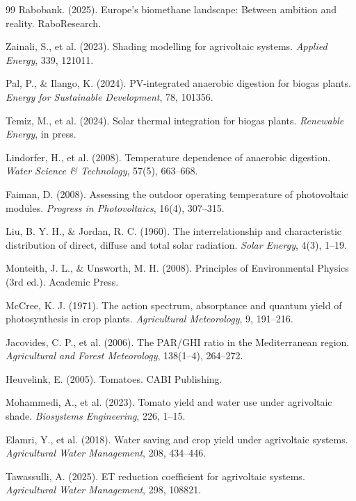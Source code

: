 \documentclass[12pt, a4paper]{article}
\begin{document}
\begin{thebibliography}{99}
 Rabobank. (2025). Europe's biomethane landscape: Between ambition and reality. RaboResearch.

 Zainali, S., et al. (2023). Shading modelling for agrivoltaic systems. \textit{Applied Energy}, 339, 121011.

 Pal, P., \& Ilango, K. (2024). PV-integrated anaerobic digestion for biogas plants. \textit{Energy for Sustainable Development}, 78, 101356.

 Temiz, M., et al. (2024). Solar thermal integration for biogas plants. \textit{Renewable Energy}, in press.

 Lindorfer, H., et al. (2008). Temperature dependence of anaerobic digestion. \textit{Water Science \& Technology}, 57(5), 663–668.

 Faiman, D. (2008). Assessing the outdoor operating temperature of photovoltaic modules. \textit{Progress in Photovoltaics}, 16(4), 307–315.

 Liu, B. Y. H., \& Jordan, R. C. (1960). The interrelationship and characteristic distribution of direct, diffuse and total solar radiation. \textit{Solar Energy}, 4(3), 1–19.

 Monteith, J. L., \& Unsworth, M. H. (2008). Principles of Environmental Physics (3rd ed.). Academic Press.

 McCree, K. J. (1971). The action spectrum, absorptance and quantum yield of photosynthesis in crop plants. \textit{Agricultural Meteorology}, 9, 191–216.

 Jacovides, C. P., et al. (2006). The PAR/GHI ratio in the Mediterranean region. \textit{Agricultural and Forest Meteorology}, 138(1–4), 264–272.

 Heuvelink, E. (2005). Tomatoes. CABI Publishing.

 Mohammedi, A., et al. (2023). Tomato yield and water use under agrivoltaic shade. \textit{Biosystems Engineering}, 226, 1–15.

 Elamri, Y., et al. (2018). Water saving and crop yield under agrivoltaic systems. \textit{Agricultural Water Management}, 208, 434–446.

 Tawassulli, A. (2025). ET reduction coefficient for agrivoltaic systems. \textit{Agricultural Water Management}, 298, 108821.


\end{thebibliography}
\end{document}
